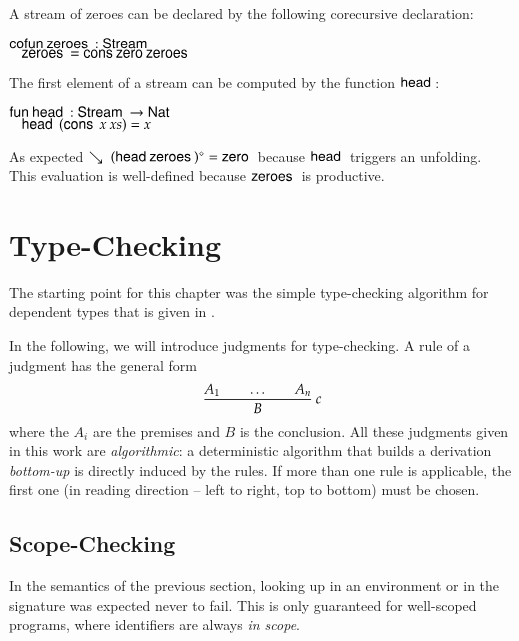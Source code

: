 A stream of zeroes can be declared by the following corecursive declaration:
\begin{bsp}
$\mathsf{cofun}\: \mathsf{zeroes}\:: \mathsf{Stream}\: $ \\
$\hspace*{3mm} \mathsf{zeroes}\: = \mathsf{cons}\: \mathsf{zero}\: \mathsf{zeroes}\:$
\end{bsp}

\noindent The first element of a stream can be computed by the function $\mathsf{head}\:$:
\begin{bsp}
$\mathsf{fun}\: \mathsf{head}\: : \mathsf{Stream}\: \rightarrow \mathsf{Nat}\:$\\
$\hspace*{3mm} \mathsf{head}\: \: (\mathsf{cons}\: \: x \: xs) = x$
\end{bsp}

As expected $\searrow\; {(\mathsf{head}\: \mathsf{zeroes}\:)^{\diamond}} = \mathsf{zero}\: $ because $\mathsf{head}\:$ triggers an unfolding. This evaluation is well-defined because $\mathsf{zeroes}\:$ is productive.

\chapter{Type-Checking}

\renewcommand\Check[5]{#1;#2;#3\vdash#4\leftleftarrows#5}
\newcommand\IsType[4]{#1;#2;#3\vdash#4\:\mathbf{Type}}
\newcommand\DataType[5]{#1;#2;#3;#4\vdash#5\:\mathbf{DataType}}
\newcommand\ConType[5]{#1;#2;#3;#4\vdash#5\:\mathbf{ConType}}
\newcommand\Infer[5]{#1;#2;#3\vdash#4\rightrightarrows#5}
\newcommand\EqVal[4]{#1;#2\vdash#3\Leftrightarrow#4}
\newcommand\FeqVal[4]{#1;#2\vdash#3{\:\leftrightarrow\:}#4}
\newcommand\DeqVal[2]{\vdash#1\leftrightarrow#2}
\newcommand\LeqVal[4]{#1;#2\vdash#3\:\leqq\:#4}
\newcommand\FleqVal[4]{#1;#2\vdash#3{\:\ll\:}#4}
\newcommand\DLeqVal[2]{\vdash#1\leq#2}
\newcommand\SzLeq[2]{\vdash#1\sqsubseteq#2}

The starting point for this chapter was the simple type-checking algorithm for dependent types that is given in \cite{coquand96algorithm}.

In the following, we will introduce judgments for type-checking.
A rule of a judgment has the general form
\[
\ \dfrac{A_1 \qquad \ldots \qquad A_n}{B}
{\: c}
\]
\noindent where the $A_i$ are the premises and $B$ is the conclusion.
All these judgments given in this work are \emph{algorithmic}: a deterministic algorithm that builds a derivation \emph{bottom-up} is directly induced by the rules. If more than one rule is applicable, the first one (in reading direction -- left to right, top to bottom) must be chosen.

\section{Scope-Checking}
In the semantics of the previous section, looking up in an environment or in the signature was expected never to fail. This is only guaranteed for well-scoped programs, where identifiers are always \emph{in scope}.

